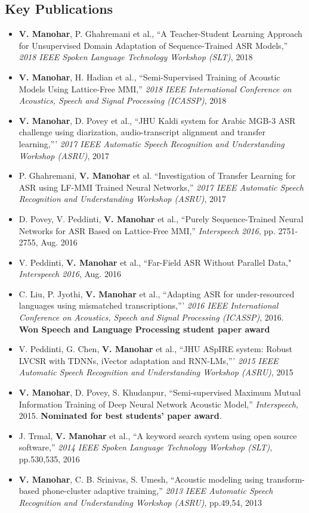 \documentclass[margin,line,pifont,palatino,courier]{res}
\begin{document}
\begin{resume}
\section{\sc Key Publications}
\begin{itemize}
  \item
  \textbf{V. Manohar}, P. Ghahremani et al., ``A Teacher-Student Learning Approach for Unsupervised Domain Adaptation of Sequence-Trained ASR Models,''  \textit{2018 IEEE Spoken Language Technology Workshop (SLT)}, 2018
  \item
  \textbf{V. Manohar}, H. Hadian et al., ``Semi-Supervised Training of Acoustic Models Using Lattice-Free MMI,'' \textit{2018 IEEE International Conference on Acoustics, Speech and Signal Processing (ICASSP)}, 2018
  \item
    \textbf{V. Manohar}, D. Povey et al., ``JHU Kaldi system for Arabic MGB-3 ASR challenge using diarization, audio-transcript alignment and transfer learning,''' \textit{2017 IEEE Automatic Speech Recognition and Understanding Workshop (ASRU)}, 2017
  \item
  P. Ghahremani, \textbf{V. Manohar} et al. ``Investigation of Transfer Learning for ASR using LF-MMI Trained Neural Networks,'' \textit{2017 IEEE Automatic Speech Recognition and Understanding Workshop (ASRU)}, 2017
  \item
    D. Povey, V. Peddinti, \textbf{V. Manohar} et al., ``Purely Sequence-Trained Neural Networks for ASR Based on Lattice-Free MMI,''  \textit{Interspeech 2016}, pp. 2751-2755, Aug. 2016
  \item
    V. Peddinti, \textbf{V. Manohar} et al., ``Far-Field ASR Without Parallel Data,"
    \textit{Interspeech 2016}, Aug. 2016
  \item
    C. Liu, P. Jyothi, \textbf{V. Manohar} et al.,
    ``Adapting ASR for under-resourced languages using mismatched
    transcriptions,'''
    \textit{2016 IEEE International Conference on Acoustics, Speech and Signal Processing (ICASSP)}, 2016. 
    \textbf{Won Speech and Language Processing student paper award}
  \item
    V. Peddinti, G. Chen, \textbf{V. Manohar} et al.,
    ``JHU ASpIRE system: Robust LVCSR with TDNNs, iVector adaptation and
    RNN-LMs,'''
    \textit{2015 IEEE Automatic Speech Recognition and Understanding Workshop (ASRU)}, 2015
  \item
    \textbf{V. Manohar}, D. Povey, S. Khudanpur,
    ``Semi-supervised Maximum Mutual Information Training of Deep Neural
    Network Acoustic Model,''
    \textit{Interspeech}, 2015. \textbf{Nominated for best students' paper award}.
  \item
    J. Trmal, \textbf{V. Manohar} et al.,
    ``A keyword search system using open source software,''
    \textit{2014 IEEE Spoken Language Technology Workshop (SLT)}, pp.530,535, 2016
  \item
    \textbf{V. Manohar}, C. B. Srinivas, S. Umesh,
    ``Acoustic modeling
    using transform-based phone-cluster adaptive training,''
    \textit{2013 IEEE Automatic Speech Recognition and Understanding Workshop (ASRU)}, pp.49,54, 2013
\end{itemize}


\end{resume}
\end{document}
